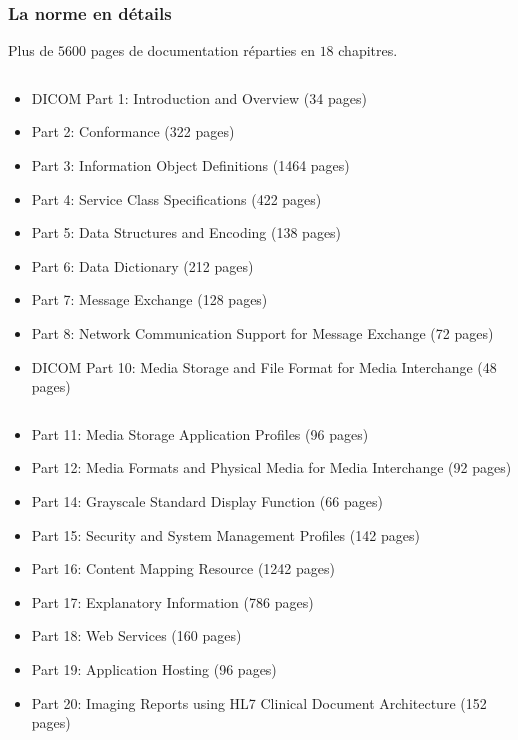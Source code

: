 	\frame
	{
		\frametitle{La norme en d\'etails}
		Plus de $5600$ pages de documentation r\'eparties en $18$ chapitres.
		
		\begin{columns}\begin{scriptsize}
	  	\begin{column}[t]{0.5\linewidth}
			\begin{itemize}
				\item DICOM Part 1: Introduction and Overview (34 pages)
				\item Part 2: Conformance (322 pages)
				\item Part 3: Information Object Definitions (1464 pages)
				\item Part 4: Service Class Specifications (422 pages)
				\item Part 5: Data Structures and Encoding (138 pages)
				\item Part 6: Data Dictionary (212 pages)
				\item Part 7: Message Exchange (128 pages)
				\item Part 8: Network Communication Support for Message Exchange (72 pages)
				\item DICOM Part 10: Media Storage and File Format for Media Interchange (48 pages)
			\end{itemize}
	  	\end{column}
	  	\begin{column}[t]{0.5\linewidth}
			\begin{itemize}
				\item Part 11: Media Storage Application Profiles (96 pages)
				\item Part 12: Media Formats and Physical Media for Media Interchange (92 pages)
				\item Part 14: Grayscale Standard Display Function (66 pages)
				\item Part 15: Security and System Management Profiles (142 pages)
				\item Part 16: Content Mapping Resource (1242 pages)
				\item Part 17: Explanatory Information (786 pages)
				\item Part 18: Web Services (160 pages)
				\item Part 19: Application Hosting (96 pages)
				\item Part 20: Imaging Reports using HL7 Clinical Document Architecture (152 pages)
			\end{itemize}
	  	\end{column}\end{scriptsize}
	  	\end{columns}
	}

